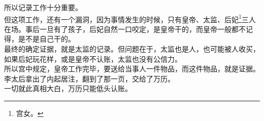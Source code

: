 \begin{multicols}{\theparacolNo}
所以记录工作十分重要。\\

但这项工作，还有一个漏洞，因为事情发生的时候，只有皇帝、太监、后妃\footnote{宫女。}三人在场。事后一旦有了孩子，后妃自然一口咬定，是皇帝干的，而皇帝一般都不记得，是不是自己干的。\\

最终的确定证据，就是太监的记录。但问题在于，太监也是人，也可能被人收买，如果后妃玩花样，或是皇帝不认账，太监也没有公信力。\\

所以宫中规定，皇帝工作完毕，要送给当事人一件物品，而这件物品，就是证据。\\

李太后拿出了内起居注，翻到了那一页，交给了万历。\\

一切就此真相大白，万历只能低头认账。\\

\ifnum{}
	\end{multicols}
\fi
\newpage
